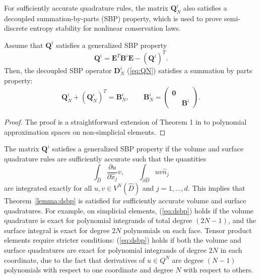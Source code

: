 \documentclass{svjour3}                     %
\renewcommand{\hat}{\widehat}
\newcommand{\pd}[2]{\frac{\partial#1}{\partial#2}}
\newcommand{\LRp}[1]{\left( #1 \right)}
\begin{document}
For sufficiently accurate quadrature rules, the matrix $\bm{Q}^i_N$ also satisfies a decoupled summation-by-parts (SBP) property, which is used to prove semi-discrete entropy stability for nonlinear conservation laws.  
\begin{theorem}%
Assume that $\bm{Q}^i$ satisfies a generalized SBP property
\[
\bm{Q}^i = \bm{E}^T\bm{B}^i\bm{E} - \LRp{\bm{Q}^i}^T.
\]
Then, the decoupled SBP operator $\bm{D}^i_N$ (\ref{eq:QN}) satisfies a summation by parts property:
\begin{gather}
\bm{Q}^i_N+\LRp{\bm{Q}^i_N}^T = \bm{B}^i_N, \qquad \bm{B}^i_N = \LRp{\begin{array}{cc}\bm{0}&\\ & \bm{B}^i\end{array}}.\label{eq:dsbp}
\end{gather}
\label{lemma:dsbp}
\end{theorem}
\begin{proof}
The proof is a straightforward extension of Theorem 1 in \cite{chan2017discretely} to polynomial approximation spaces on non-simplicial elements.  
\end{proof}

The matrix $\bm{Q}^i$ satisfies a generalized SBP property if the volume and surface quadrature rules are sufficiently accurate such that the quantities
\[
\int_{\hat{D}} \pd{u}{\hat{x}_j} v, \qquad \int_{\partial \hat{D}} u v \hat{n}_j
\]
are integrated exactly for all $u,v \in V^N\LRp{\hat{D}}$ and $j = 1,\ldots, d$.  This implies that Theorem~\ref{lemma:dsbp} is satisfied for sufficiently accurate volume and surface quadratures.  For example, on simplicial elements, (\ref{eq:dsbp}) holds if the volume quadrature is exact for polynomial integrands of total degree $(2N-1)$, and the surface integral is exact for degree $2N$ polynomials on each face.  Tensor product elements require stricter conditions: (\ref{eq:dsbp}) holds if both the volume and surface quadratures are exact for polynomial integrands of degree $2N$ in each coordinate, due to the fact that derivatives of $u\in Q^N$ are degree $(N-1)$ polynomials with respect to one coordinate and degree $N$ with respect to others.  
\end{document}
